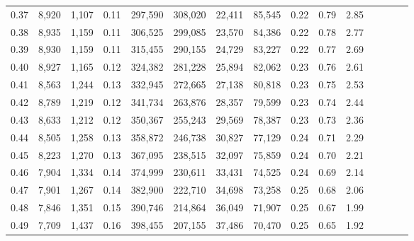 \begin{tabular}{rrrcrrrrrrrrrrr}
0.37 &   8,920 &  1,107 &                                       0.11 &  297,590 &  308,020 &   22,411 &   85,545 &  0.22 &  0.79 &                         2.85 \\
0.38 &   8,935 &  1,159 &                                       0.11 &  306,525 &  299,085 &   23,570 &   84,386 &  0.22 &  0.78 &                         2.77 \\
0.39 &   8,930 &  1,159 &                                       0.11 &  315,455 &  290,155 &   24,729 &   83,227 &  0.22 &  0.77 &                         2.69 \\
0.40 &   8,927 &  1,165 &                                       0.12 &  324,382 &  281,228 &   25,894 &   82,062 &  0.23 &  0.76 &                         2.61 \\
0.41 &   8,563 &  1,244 &                                       0.13 &  332,945 &  272,665 &   27,138 &   80,818 &  0.23 &  0.75 &                         2.53 \\
0.42 &   8,789 &  1,219 &                                       0.12 &  341,734 &  263,876 &   28,357 &   79,599 &  0.23 &  0.74 &                         2.44 \\
0.43 &   8,633 &  1,212 &                                       0.12 &  350,367 &  255,243 &   29,569 &   78,387 &  0.23 &  0.73 &                         2.36 \\
0.44 &   8,505 &  1,258 &                                       0.13 &  358,872 &  246,738 &   30,827 &   77,129 &  0.24 &  0.71 &                         2.29 \\
0.45 &   8,223 &  1,270 &                                       0.13 &  367,095 &  238,515 &   32,097 &   75,859 &  0.24 &  0.70 &                         2.21 \\
0.46 &   7,904 &  1,334 &                                       0.14 &  374,999 &  230,611 &   33,431 &   74,525 &  0.24 &  0.69 &                         2.14 \\
0.47 &   7,901 &  1,267 &                                       0.14 &  382,900 &  222,710 &   34,698 &   73,258 &  0.25 &  0.68 &                         2.06 \\
0.48 &   7,846 &  1,351 &                                       0.15 &  390,746 &  214,864 &   36,049 &   71,907 &  0.25 &  0.67 &                         1.99 \\
0.49 &   7,709 &  1,437 &                                       0.16 &  398,455 &  207,155 &   37,486 &   70,470 &  0.25 &  0.65 &                         1.92 \\

\end{tabular}
